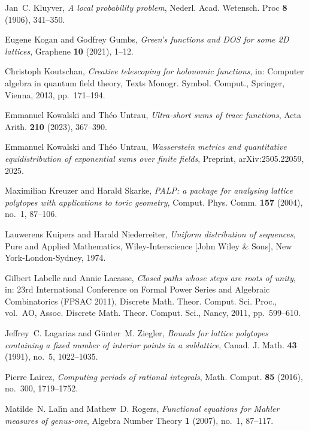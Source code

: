\documentclass[12pt,reqno]{amsart}
\theoremstyle{definition}
\theoremstyle{plain}
\theoremstyle{definition}
\begin{document}
\begin{thebibliography}{100}
Jan~C. Kluyver, \emph{A local probability problem}, Nederl. Acad. Wetensch.
  Proc \textbf{8} (1906), 341--350.

Eugene Kogan and Godfrey Gumbs, \emph{Green’s functions and {DOS} for some
  2{D} lattices}, Graphene \textbf{10} (2021), 1--12.

Christoph Koutschan, \emph{Creative telescoping for holonomic functions}, in:
  Computer algebra in quantum field theory, Texts Monogr. Symbol. Comput.,
  Springer, Vienna, 2013, pp.~171--194.

Emmanuel Kowalski and Th\'eo Untrau, \emph{Ultra-short sums of trace
  functions}, Acta Arith. \textbf{210} (2023), 367--390. 

Emmanuel Kowalski and Th{\'e}o Untrau, \emph{Wasserstein metrics and
  quantitative equidistribution of exponential sums over finite fields},
  Preprint, {arXiv}:2505.22059, 2025.

Maximilian Kreuzer and Harald Skarke, \emph{P{ALP}: a package for analysing
  lattice polytopes with applications to toric geometry}, Comput. Phys. Comm.
  \textbf{157} (2004), no.~1, 87--106.

Lauwerens Kuipers and Harald Niederreiter, \emph{Uniform distribution of
  sequences}, Pure and Applied Mathematics, Wiley-Interscience [John Wiley \&
  Sons], New York-London-Sydney, 1974.

Gilbert Labelle and Annie Lacasse, \emph{Closed paths whose steps are roots of
  unity}, in: 23rd {I}nternational {C}onference on {F}ormal {P}ower {S}eries
  and {A}lgebraic {C}ombinatorics ({FPSAC} 2011), Discrete Math. Theor. Comput.
  Sci. Proc., vol.~AO, Assoc. Discrete Math. Theor. Comput. Sci., Nancy, 2011,
  pp.~599--610.

Jeffrey~C. Lagarias and G\"{u}nter~M. Ziegler, \emph{Bounds for lattice
  polytopes containing a fixed number of interior points in a sublattice},
  Canad. J. Math. \textbf{43} (1991), no.~5, 1022--1035.

Pierre Lairez, \emph{Computing periods of rational integrals}, Math. Comput.
  \textbf{85} (2016), no.~300, 1719--1752.

Matilde~N. Lal{\'{\i}}n and Mathew~D. Rogers, \emph{Functional equations for
  {Mahler} measures of genus-one}, Algebra Number Theory \textbf{1} (2007),
  no.~1, 87--117.


\end{thebibliography}
\end{document}
